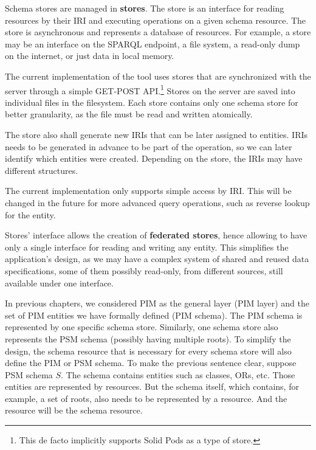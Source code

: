 Schema stores are managed in \textbf{stores}. The store is an interface for reading resources by their IRI and executing operations on a given schema resource. The store is asynchronous and represents a database of resources. For example, a store may be an interface on the SPARQL endpoint, a file system, a read-only dump on the internet, or just data in local memory.

The current implementation of the tool uses stores that are synchronized with the server through a simple GET-POST API.\footnote{This de facto implicitly supports Solid Pods as a type of store.} Stores on the server are saved into individual files in the filesystem. Each store contains only one schema store for better granularity, as the file must be read and written atomically.

\medskip

The store also shall generate new IRIs that can be later assigned to entities. IRIs needs to be generated in advance to be part of the operation, so we can later identify which entities were created. Depending on the store, the IRIs may have different structures.

The current implementation only supports simple access by IRI. This will be changed in the future for more advanced query operations, such as reverse lookup for the entity.

\medskip

Stores' interface allows the creation of \textbf{federated stores}, hence allowing to have only a single interface for reading and writing any entity. This simplifies the application's design, as we may have a complex system of shared and reused data specifications, some of them possibly read-only, from different sources, still available under one interface.

\medskip

In previous chapters, we considered PIM as the general layer (PIM layer) and the set of PIM entities we have formally defined (PIM schema). The PIM schema is represented by one specific schema store. Similarly, one schema store also represents the PSM schema (possibly having multiple roots). To simplify the design, the schema resource that is necessary for every schema store will also define the PIM or PSM schema. To make the previous sentence clear, suppose PSM schema $S$. The schema contains entities such as classes, ORs, etc. Those entities are represented by resources. But the schema itself, which contains, for example, a set of roots, also needs to be represented by a resource. And the resource will be the schema resource.

